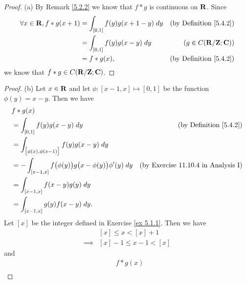 \begin{proof}{(a)}
    By Remark \ref{5.2.2} we know that \(f * g\) is continuous on \(\mathbf{R}\).
    Since
    \begin{align*}
        \forall x \in \mathbf{R}, f * g(x + 1) & = \int_{[0, 1]} f(y) g(x + 1 - y) \; dy & \text{(by Definition \ref{5.4.2})} \\
                                       & = \int_{[0, 1]} f(y) g(x - y) \; dy     & (g \in C(\mathbf{R} / \mathbf{Z} ; \mathbf{C}))            \\
                                       & = f * g(x),                             & \text{(by Definition \ref{5.4.2})}
    \end{align*}
    we know that \(f * g \in C(\mathbf{R} / \mathbf{Z} ; \mathbf{C})\).
\end{proof}

\begin{proof}{(b)}
    Let \(x \in \mathbf{R}\) and let \(\phi : [x - 1, x] \mapsto [0, 1]\) be the function \(\phi(y) = x - y\).
    Then we have
    \begin{align*}
         & f * g(x)                                                                                                                   \\
         & = \int_{[0, 1]} f(y) g(x - y) \; dy                                           & \text{(by Definition \ref{5.4.2})}         \\
         & = \int_{\big[\phi(x), \phi(x - 1)\big]} f(y) g(x - y) \; dy                                                                \\
         & = -\int_{[x - 1, x]} f\big(\phi(y)\big) g\big(x - \phi(y)\big) \phi'(y) \; dy & \text{(by Exercise 11.10.4 in Analysis I)} \\
         & = \int_{[x - 1, x]} f(x - y) g(y) \; dy                                                                                    \\
         & = \int_{[x - 1, x]} g(y) f(x - y) \; dy.                                                                                   \\
    \end{align*}
    Let \([x]\) be the integer defined in Exercise \ref{ex 5.1.1}.
    Then we have
    \begin{align*}
                 & [x] \leq x < [x] + 1     \\
        \implies & [x] - 1 \leq x - 1 < [x]
    \end{align*}
    and
    \begin{align*}
         & f * g(x)                                                                                                                             \\

\end{align*}
\end{proof}
